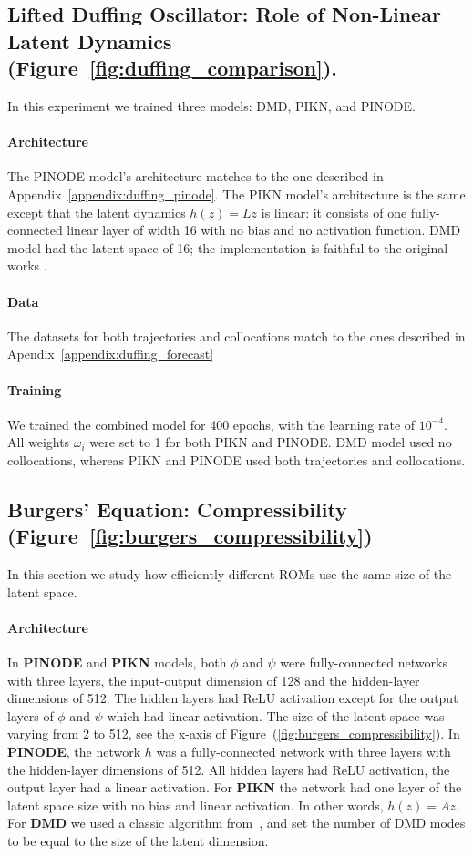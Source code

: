 \subsection{Lifted Duffing Oscillator: Role of Non-Linear Latent Dynamics (Figure~\ref{fig:duffing_comparison}).}
\label{appendix:duffing_non_linearity}
In this experiment we trained three models: DMD, PIKN, and PINODE. 

\paragraph{Architecture} The PINODE model's architecture matches to the one described in Appendix~\ref{appendix:duffing_pinode}. The PIKN model's architecture is the same except that the latent dynamics $h(z) = Lz$ is linear: it consists of one fully-connected linear layer of width 16 with no bias and no activation function. DMD model had the latent space of 16; the implementation is faithful to the original works \cite{kutz2016dynamic}.
\paragraph{Data} The datasets for both trajectories and collocations match to the ones described in Apendix~\ref{appendix:duffing_forecast}

\paragraph{Training} We trained the combined model for 400 epochs, with the learning rate of $10^{-4}$. All weights $\omega_i$ were set to 1 for both PIKN and PINODE. DMD model used no collocations, whereas PIKN and PINODE used both trajectories and collocations. 

\subsection{Burgers' Equation: Compressibility (Figure~\ref{fig:burgers_compressibility})}
\label{appendix:burgers_compressibility}
In this section we study how efficiently different ROMs use the same size of the latent space.

\paragraph{Architecture} In \textbf{PINODE} and \textbf{PIKN} models, both $\phi$ and $\psi$ were fully-connected networks with three layers, the input-output dimension of 128 and the hidden-layer dimensions of 512. The hidden layers had ReLU activation except for the output layers of $\phi$ and $\psi$ which had linear activation.
The size of the latent space was varying from 2 to 512, see the x-axis of Figure~(\ref{fig:burgers_compressibility}). 
In \textbf{PINODE}, the network $h$ was a fully-connected network with three layers with the hidden-layer dimensions of 512. All hidden layers had ReLU activation, the output layer had a linear activation. For \textbf{PIKN} the network had one layer of the latent space size with no bias and linear activation. In other words, $h(z) = Az$.
For \textbf{DMD} we used a classic algorithm from~\cite{kutz2016dynamic}, and set the number of DMD modes to be equal to the size of the latent dimension. 
